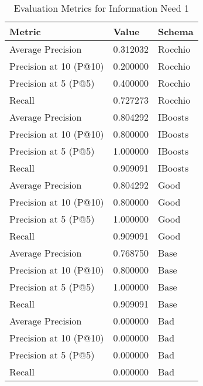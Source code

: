 \begingroup
    \renewcommand{\arraystretch}{2} %
    \begin{table}[]
        \centering
        \begin{tabular}{l | l | l}
            Metric & Value & Schema \\
            \hline
            Average Precision & 0.312032 & Rocchio \\
            Precision at 10 (P@10) & 0.200000 & Rocchio \\
            Precision at 5 (P@5) & 0.400000 & Rocchio\\
            Recall & 0.727273 & Rocchio\\
            \hline
            Average Precision & 0.804292 & IBoosts\\
            Precision at 10 (P@10) & 0.800000 & IBoosts\\
            Precision at 5 (P@5) & 1.000000 & IBoosts\\
            Recall & 0.909091 & IBoosts\\
            \hline
            Average Precision & 0.804292 & Good\\
            Precision at 10 (P@10) & 0.800000 & Good\\
            Precision at 5 (P@5) & 1.000000 & Good\\
            Recall & 0.909091 & Good\\
            \hline
            Average Precision & 0.768750 & Base\\
            Precision at 10 (P@10) & 0.800000 & Base\\
            Precision at 5 (P@5) & 1.000000 & Base\\
            Recall & 0.909091 & Base\\
            \hline
            Average Precision & 0.000000 & Bad \\
            Precision at 10 (P@10) & 0.000000 & Bad \\
            Precision at 5 (P@5) & 0.000000 & Bad \\
            Recall & 0.000000 & Bad \\
        \end{tabular}
        \caption{Evaluation Metrics for Information Need 1}
        \label{tab:metrics-info-1-2}
    \end{table}
\endgroup